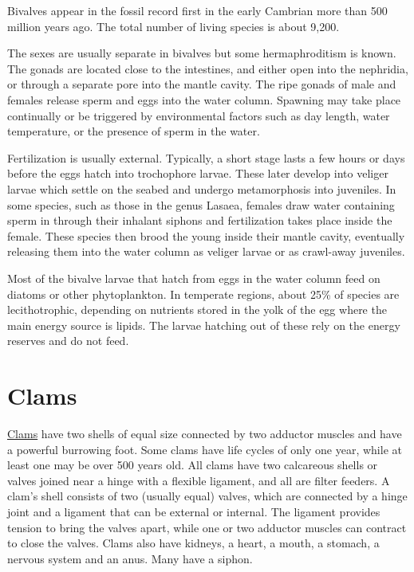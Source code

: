Bivalves appear in the fossil record first in the early Cambrian more
than 500 million years ago. The total number of living species is about
9,200.

The sexes are usually separate in bivalves but some hermaphroditism is
known. The gonads are located close to the intestines, and either open
into the nephridia, or through a separate pore into the mantle cavity.
The ripe gonads of male and females release sperm and eggs into the
water column. Spawning may take place continually or be triggered by
environmental factors such as day length, water temperature, or the
presence of sperm in the water.

Fertilization is usually external. Typically, a short stage lasts a few
hours or days before the eggs hatch into trochophore larvae. These later
develop into veliger larvae which settle on the seabed and undergo
metamorphosis into juveniles. In some species, such as those in the
genus Lasaea, females draw water containing sperm in through their
inhalant siphons and fertilization takes place inside the female. These
species then brood the young inside their mantle cavity, eventually
releasing them into the water column as veliger larvae or as crawl-away
juveniles.

Most of the bivalve larvae that hatch from eggs in the water column feed
on diatoms or other phytoplankton. In temperate regions, about 25\% of
species are lecithotrophic, depending on nutrients stored in the yolk of
the egg where the main energy source is lipids. The larvae hatching out
of these rely on the energy reserves and do not feed.

\section{Clams}\label{clams}

\href{https://en.wikipedia.org/wiki/Clam}{Clams} have two shells of
equal size connected by two adductor muscles and have a powerful
burrowing foot. Some clams have life cycles of only one year, while at
least one may be over 500 years old. All clams have two calcareous
shells or valves joined near a hinge with a flexible ligament, and all
are filter feeders. A clam's shell consists of two (usually equal)
valves, which are connected by a hinge joint and a ligament that can be
external or internal. The ligament provides tension to bring the valves
apart, while one or two adductor muscles can contract to close the
valves. Clams also have kidneys, a heart, a mouth, a stomach, a nervous
system and an anus. Many have a siphon.

